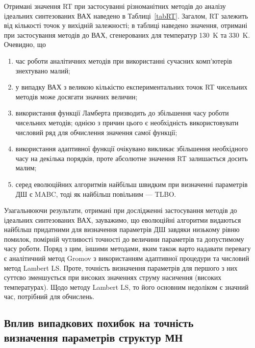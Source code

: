 Отримані значення RT при застосуванні різноманітних методів до аналізу ідеальних синтезованих ВАХ наведено в Таблиці~\ref{tabRT}.
Загалом, RT залежить від кількості точок у вихідній залежності;
в таблиці наведено значення, отримані при застосування методів до ВАХ, сгенерованих для температур 130~K та 330~K.
Очевидно, що
\begin{enumerate}[label=\asbuk*),leftmargin=0em,itemindent=1.5em]
\item час роботи аналітичних методів при використанні сучасних комп'ютерів знехтувано малий;
\item у випадку ВАХ з великою кількістю експериментальних точок RT чисельних методів може досягати значних величин;
\item використання функції Ламберта призводить до збільшення часу роботи чисельних методів; однією з причин цього є необхідність використовувати числовий ряд для обчислення значення самої функції;
\item використання адаптивної функції очікувано викликає збільшення необхідного часу на декілька порядків, проте абсолютне значення RT залишається досить малим;
\item серед еволюційних алгоритмів найбільш швидким при визначенні параметрів ДШ є MABC, тоді як найбільш повільним --- TLBO.
\end{enumerate}


Узагальнюючи результати, отримані при дослідженні застосування методів до ідеальних синтезованих ВАХ, зауважимо,
що еволюційні алгоритми видаються найбільш придатними для визначення параметрів ДШ завдяки низькому рівню помилок, помірній чутливості точності до величини параметрів
та допустимому часу роботи.
Поряд з цим, іншими методами, яким також варто надавати перевагу є аналітичний метод Gromov з використанням адаптивної процедури та числовий метод Lambert LS.
Проте, точність визначення параметрів для першого з них суттєво зменшується при високих значеннях струму насичення (високих температурах).
Щодо методу Lambert LS, то його основним недоліком є значний час, потрібний для обчислень.


\subsection{Вплив випадкових похибок на точність визначення параметрів структур МН}

